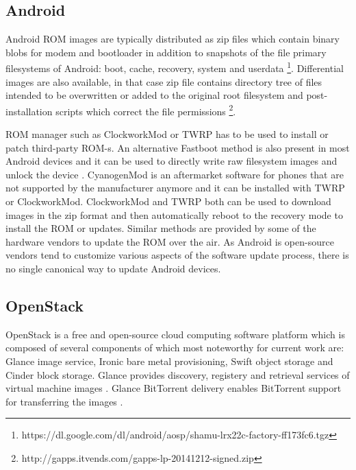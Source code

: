 \documentclass[a4paper,11pt]{kth-mag}
\begin{document}
\cite{software-update-scheme-by-airwaves}

\subsection{Android}

Android ROM images are typically distributed as zip files which contain
binary blobs for modem and bootloader in addition to snapshots of the
file primary filesystems of Android: boot, cache, recovery, system and
userdata
\footnote{https://dl.google.com/dl/android/aosp/shamu-lrx22c-factory-ff173fc6.tgz}.
Differential images are also available, in that case zip file contains
directory tree of files intended to be overwritten or added to the original
root filesystem and post-installation scripts which correct the file permissions
\footnote{http://gapps.itvends.com/gapps-lp-20141212-signed.zip}.

ROM manager such as ClockworkMod \cite{clockworkmod} or
TWRP \cite{twrp} has to be used to install or patch
third-party ROM-s.
An alternative Fastboot method is also present in most
Android devices and it can be used to directly write raw filesystem images and
unlock the device
\cite{fastboot}.
CyanogenMod is an aftermarket software for phones that are not
supported by the manufacturer anymore and it can
be installed with TWRP or ClockworkMod.
ClockworkMod and TWRP both can be used to download
images in the zip format and then
automatically reboot to the recovery mode to install the
ROM or updates.
Similar methods are provided by some of the hardware
vendors to update the ROM over the air.
As Android is open-source vendors tend to customize various aspects
of the software update process, there is no single canonical
way to update Android devices.



\subsection{OpenStack}

OpenStack is a free and open-source cloud computing software platform
which is composed of several components of which most noteworthy for current work are:
Glance image service, Ironic bare metal provisioning,
Swift object storage and Cinder block storage.
Glance provides discovery, registery and retrieval services of virtual machine images
\cite{glance}.
Glance BitTorrent delivery enables BitTorrent support for transferring the images
\cite{glance-bittorrent-delivery}.
\end{document}
